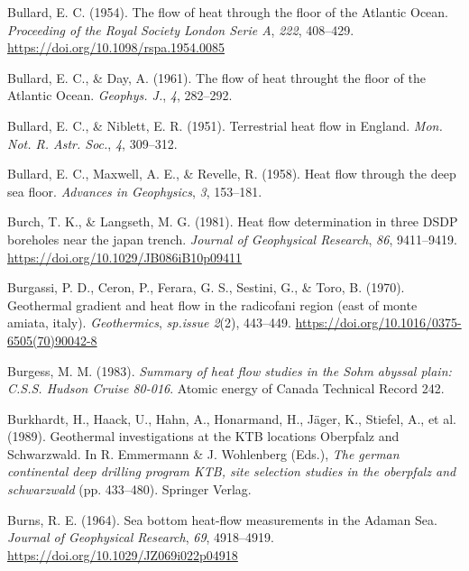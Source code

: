 \documentclass[draft,linenumbers]{agujournal2018}
\begin{document}
\leavevmode{}%
Bullard, E. C. (1954). The flow of heat through the floor of the
{Atlantic Ocean}. \emph{Proceeding of the Royal Society London Serie A},
\emph{222}, 408--429. \url{https://doi.org/10.1098/rspa.1954.0085}

\leavevmode{}%
Bullard, E. C., \& Day, A. (1961). The flow of heat throught the floor
of the {Atlantic Ocean}. \emph{Geophys. J.}, \emph{4}, 282--292.

\leavevmode{}%
Bullard, E. C., \& Niblett, E. R. (1951). Terrestrial heat flow in
{England}. \emph{Mon. Not. R. Astr. Soc.}, \emph{4}, 309--312.

\leavevmode{}%
Bullard, E. C., Maxwell, A. E., \& Revelle, R. (1958). Heat flow through
the deep sea floor. \emph{Advances in Geophysics}, \emph{3}, 153--181.

\leavevmode{}%
Burch, T. K., \& Langseth, M. G. (1981). Heat flow determination in
three DSDP boreholes near the japan trench. \emph{Journal of Geophysical
Research}, \emph{86}, 9411--9419.
\url{https://doi.org/10.1029/JB086iB10p09411}

\leavevmode{}%
Burgassi, P. D., Ceron, P., Ferara, G. S., Sestini, G., \& Toro, B.
(1970). Geothermal gradient and heat flow in the radicofani region (east
of monte amiata, italy). \emph{Geothermics}, \emph{sp.issue 2}(2),
443--449. \url{https://doi.org/10.1016/0375-6505(70)90042-8}

\leavevmode{}%
Burgess, M. M. (1983). \emph{Summary of heat flow studies in the {Sohm}
abyssal plain: {C.S.S. Hudson Cruise} 80-016}. Atomic energy of Canada
Technical Record 242.

\leavevmode{}%
Burkhardt, H., Haack, U., Hahn, A., Honarmand, H., Jäger, K., Stiefel,
A., et al. (1989). Geothermal investigations at the {KTB locations
Oberpfalz and Schwarzwald}. In R. Emmermann \& J. Wohlenberg (Eds.),
\emph{The german continental deep drilling program KTB, site selection
studies in the oberpfalz and schwarzwald} (pp. 433--480). Springer
Verlag.

\leavevmode{}%
Burns, R. E. (1964). Sea bottom heat-flow measurements in the {Adaman
Sea}. \emph{Journal of Geophysical Research}, \emph{69}, 4918--4919.
\url{https://doi.org/10.1029/JZ069i022p04918}
\end{document}
